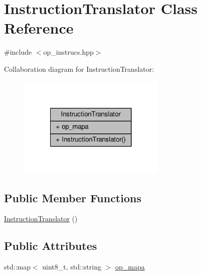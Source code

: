 \hypertarget{classInstructionTranslator}{\section{Instruction\+Translator Class Reference}
\label{classInstructionTranslator}
}


{\ttfamily \#include $<$op\+\_\+instrucs.\+hpp$>$}



Collaboration diagram for Instruction\+Translator\+:\nopagebreak
\begin{figure}[H]
\begin{center}
\leavevmode
\includegraphics[width=200pt]{classInstructionTranslator__coll__graph}
\end{center}
\end{figure}
\subsection*{Public Member Functions}
\begin{DoxyCompactItemize}
\item 
\hyperlink{classInstructionTranslator_a3b5155de7dc2b808c89c486c0a6834f0}{Instruction\+Translator} ()
\end{DoxyCompactItemize}
\subsection*{Public Attributes}
\begin{DoxyCompactItemize}
\item 
std\+::map$<$ uint8\+\_\+t, std\+::string $>$ \hyperlink{classInstructionTranslator_aec4af4be8b3106a70938e03e2ff6a658}{op\+\_\+mapa}
\end{DoxyCompactItemize}


